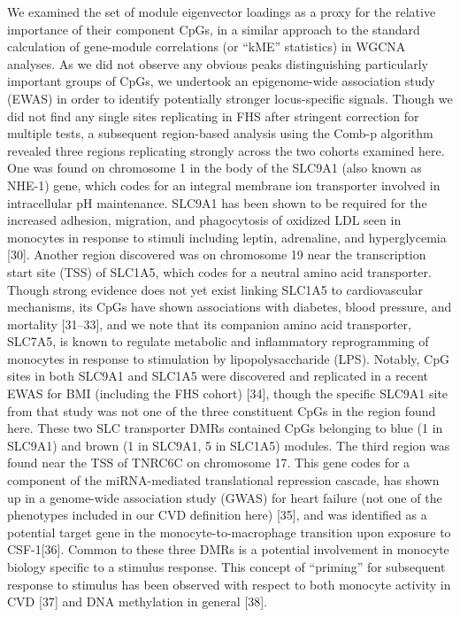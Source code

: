 \documentclass[]{article}
\theoremstyle{definition}
\theoremstyle{definition}
\theoremstyle{definition}
\theoremstyle{remark}
\begin{document}
We examined the set of module eigenvector loadings as a proxy for the
relative importance of their component CpGs, in a similar approach to
the standard calculation of gene-module correlations (or ``kME''
statistics) in WGCNA analyses. As we did not observe any obvious peaks
distinguishing particularly important groups of CpGs, we undertook an
epigenome-wide association study (EWAS) in order to identify potentially
stronger locus-specific signals. Though we did not find any single sites
replicating in FHS after stringent correction for multiple tests, a
subsequent region-based analysis using the Comb-p algorithm revealed
three regions replicating strongly across the two cohorts examined here.
One was found on chromosome 1 in the body of the SLC9A1 (also known as
NHE-1) gene, which codes for an integral membrane ion transporter
involved in intracellular pH maintenance. SLC9A1 has been shown to be
required for the increased adhesion, migration, and phagocytosis of
oxidized LDL seen in monocytes in response to stimuli including leptin,
adrenaline, and hyperglycemia {[}30{]}. Another region discovered was on
chromosome 19 near the transcription start site (TSS) of SLC1A5, which
codes for a neutral amino acid transporter. Though strong evidence does
not yet exist linking SLC1A5 to cardiovascular mechanisms, its CpGs have
shown associations with diabetes, blood pressure, and mortality
{[}31--33{]}, and we note that its companion amino acid transporter,
SLC7A5, is known to regulate metabolic and inflammatory reprogramming of
monocytes in response to stimulation by lipopolysaccharide (LPS).
Notably, CpG sites in both SLC9A1 and SLC1A5 were discovered and
replicated in a recent EWAS for BMI (including the FHS cohort) {[}34{]},
though the specific SLC9A1 site from that study was not one of the three
constituent CpGs in the region found here. These two SLC transporter
DMRs contained CpGs belonging to blue (1 in SLC9A1) and brown (1 in
SLC9A1, 5 in SLC1A5) modules. The third region was found near the TSS of
TNRC6C on chromosome 17. This gene codes for a component of the
miRNA-mediated translational repression cascade, has shown up in a
genome-wide association study (GWAS) for heart failure (not one of the
phenotypes included in our CVD definition here) {[}35{]}, and was
identified as a potential target gene in the monocyte-to-macrophage
transition upon exposure to CSF-1{[}36{]}. Common to these three DMRs is
a potential involvement in monocyte biology specific to a stimulus
response. This concept of ``priming'' for subsequent response to
stimulus has been observed with respect to both monocyte activity in CVD
{[}37{]} and DNA methylation in general {[}38{]}.
\end{document}
